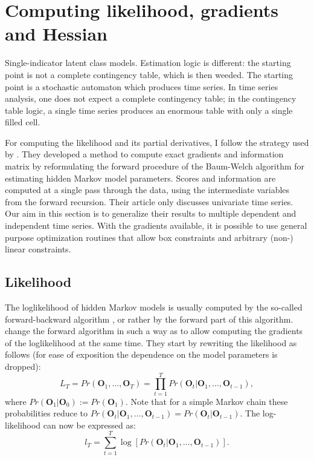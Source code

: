 \documentclass[a4paper,man,nobf]{apa}
\newcommand{\vc}{\mathbf}
\begin{document}
\section{Computing likelihood, gradients and Hessian}

Single-indicator latent class models. Estimation logic is different: 
the starting point is not a complete contingency table, which is then 
weeded. The starting point is a stochastic automaton which produces 
time series. In time series analysis, one does not expect a complete 
contingency table; in the contingency table logic, a single time 
series produces an enormous table with only a single filled cell. 

For computing the likelihood and its partial derivatives, I follow 
the strategy used by \cite{Lys2002}. They developed a method to 
compute exact gradients and information matrix by reformulating the 
forward procedure of the Baum-Welch  algorithm for estimating hidden 
Markov model parameters. Scores and information are computed at a 
single pass through the data, using the intermediate variables from 
the forward recursion. Their article only discusses univariate time 
series. Our aim in this section is to generalize their results to 
multiple dependent and independent time series. With the gradients 
available, it is possible to use general purpose optimization 
routines that allow box constraints and arbitrary (non-) linear 
constraints. 


\subsection{Likelihood}

The loglikelihood of hidden Markov models is usually computed by the 
so-called forward-backward algorithm \citep{Bau66,Rab89}, or rather 
by the forward part of this algorithm.
\cite{Lys2002} change the forward algorithm in such a way as to allow 
computing the gradients of the loglikelihood at the same time. They 
start by rewriting the likelihood as follows (for ease of exposition 
the dependence on the model parameters is dropped): 
\begin{equation}
	L_{T} = Pr(\vc{O}_{1}, \ldots, \vc{O}_{T}) = \prod_{t=1}^{T} 
Pr(\vc{O}_{t}|\vc{O}_{1}, 
	\ldots, \vc{O}_{t-1}), 
	\label{condLike}
\end{equation}
where $Pr(\vc{O}_{1}|\vc{O}_{0}):=Pr(\vc{O}_{1})$. Note that for a 
simple Markov chain these probabilities reduce to 
$Pr(\vc{O}_{t}|\vc{O}_{1},\ldots, 
\vc{O}_{t-1})=Pr(\vc{O}_{t}|\vc{O}_{t-1})$.
The log-likelihood can now be expressed as:
\begin{equation}
	l_{T} = \sum_{t=1}^{T} \log[Pr(\vc{O}_{t}|\vc{O}_{1}, \ldots, 
\vc{O}_{t-1})].
	\label{eq:condLogl}
\end{equation}
\end{document}
